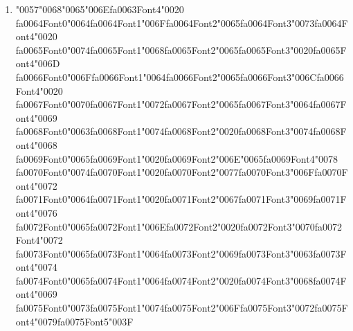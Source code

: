 \documentclass[12pt]{article}
\begin{document}
\begin{enumerate}[label=Q\arabic*.]
\begin{enumerate}[label=(\Alph*)]
    \item A deeper network with more representational power
    \item A single linear model
    \item A recurrent neural network
    \item A decision tree
\end{enumerate}
\item {\char"0057}{\char"0068}{\char"0065}{\char"006E}{\csname fa0063Font4\endcsname\char"0020} {\csname fa0064Font0\endcsname\char"0064}{\csname fa0064Font1\endcsname\char"006F}{\csname fa0064Font2\endcsname\char"0065}{\csname fa0064Font3\endcsname\char"0073}{\csname fa0064Font4\endcsname\char"0020} {\csname fa0065Font0\endcsname\char"0074}{\csname fa0065Font1\endcsname\char"0068}{\csname fa0065Font2\endcsname\char"0065}{\csname fa0065Font3\endcsname\char"0020}{\csname fa0065Font4\endcsname\char"006D} {\csname fa0066Font0\endcsname\char"006F}{\csname fa0066Font1\endcsname\char"0064}{\csname fa0066Font2\endcsname\char"0065}{\csname fa0066Font3\endcsname\char"006C}{\csname fa0066Font4\endcsname\char"0020} {\csname fa0067Font0\endcsname\char"0070}{\csname fa0067Font1\endcsname\char"0072}{\csname fa0067Font2\endcsname\char"0065}{\csname fa0067Font3\endcsname\char"0064}{\csname fa0067Font4\endcsname\char"0069} {\csname fa0068Font0\endcsname\char"0063}{\csname fa0068Font1\endcsname\char"0074}{\csname fa0068Font2\endcsname\char"0020}{\csname fa0068Font3\endcsname\char"0074}{\csname fa0068Font4\endcsname\char"0068} {\csname fa0069Font0\endcsname\char"0065}{\csname fa0069Font1\endcsname\char"0020}{\csname fa0069Font2\endcsname\char"006E}{\char"0065}{\csname fa0069Font4\endcsname\char"0078} {\csname fa0070Font0\endcsname\char"0074}{\csname fa0070Font1\endcsname\char"0020}{\csname fa0070Font2\endcsname\char"0077}{\csname fa0070Font3\endcsname\char"006F}{\csname fa0070Font4\endcsname\char"0072} {\csname fa0071Font0\endcsname\char"0064}{\csname fa0071Font1\endcsname\char"0020}{\csname fa0071Font2\endcsname\char"0067}{\csname fa0071Font3\endcsname\char"0069}{\csname fa0071Font4\endcsname\char"0076} {\csname fa0072Font0\endcsname\char"0065}{\csname fa0072Font1\endcsname\char"006E}{\csname fa0072Font2\endcsname\char"0020}{\csname fa0072Font3\endcsname\char"0070}{\csname fa0072Font4\endcsname\char"0072} {\csname fa0073Font0\endcsname\char"0065}{\csname fa0073Font1\endcsname\char"0064}{\csname fa0073Font2\endcsname\char"0069}{\csname fa0073Font3\endcsname\char"0063}{\csname fa0073Font4\endcsname\char"0074} {\csname fa0074Font0\endcsname\char"0065}{\csname fa0074Font1\endcsname\char"0064}{\csname fa0074Font2\endcsname\char"0020}{\csname fa0074Font3\endcsname\char"0068}{\csname fa0074Font4\endcsname\char"0069} {\csname fa0075Font0\endcsname\char"0073}{\csname fa0075Font1\endcsname\char"0074}{\csname fa0075Font2\endcsname\char"006F}{\csname fa0075Font3\endcsname\char"0072}{\csname fa0075Font4\endcsname\char"0079}{\csname fa0075Font5\endcsname\char"003F}

\end{enumerate}
\end{document}
